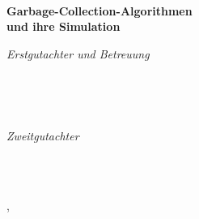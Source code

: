 \begin{titlepage}
	\vfill
	
	\centering
	
	{\large \thesisSubject} \\[5mm]
	{\huge \color{ctcolortitle}\textbf{Garbage-Collection-Algorithmen \\ und ihre Simulation} \\[10mm]}
	{\LARGE \thesisName}

	\vfill
	\begin{minipage}[t]{.4\textwidth}
		\raggedleft
		\textit{Erstgutachter und Betreuung}
	\end{minipage}
	\hspace*{15pt}
	\begin{minipage}[t]{.45\textwidth}
		{\Large \thesisFirstReviewer} \\
	\end{minipage} \\[0mm]
	\begin{minipage}[t]{.4\textwidth}
		\raggedleft
		\textit{Zweitgutachter}
	\end{minipage}
	\hspace*{15pt}
	\begin{minipage}[t]{.45\textwidth}
		{\Large \thesisSecondReviewer} \\
	\end{minipage} \\[10mm]

	\thesisAuthorCity, \thesisDate \\

\end{titlepage}



